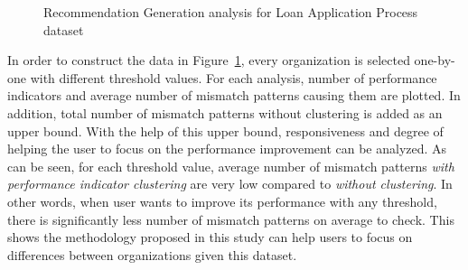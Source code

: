 \begin{itemize}
\begin{figure}[t!]
    	\caption{Recommendation Generation analysis for Loan Application Process dataset}
      \label{fig:loan-recommendation-generation-analysis}
    \end{figure}
  In order to construct the data in Figure~\ref{fig:loan-recommendation-generation-analysis}, every organization is selected one-by-one with different threshold values. For each analysis, number of performance indicators and average number of mismatch patterns causing them are plotted. In addition, total number of mismatch patterns without clustering is added as an upper bound. With the help of this upper bound, responsiveness and degree of helping the user to focus on the performance improvement can be analyzed. As can be seen, for each threshold value, average number of mismatch patterns \textit{with performance indicator clustering} are very low compared to \textit{without clustering}. In other words, when user wants to improve its performance with any threshold, there is significantly less number of mismatch patterns on average to check. This shows the methodology proposed in this study can help users to focus on differences between organizations given this dataset.
\end{itemize}